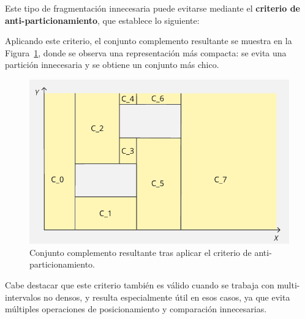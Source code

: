 Este tipo de fragmentación innecesaria puede evitarse mediante el \textbf{criterio de anti-particionamiento}, que establece lo siguiente:

\begin{center}
\end{center}


Aplicando este criterio, el conjunto complemento resultante se muestra en la Figura~\ref{fig:compleNue}, donde se observa una representación más compacta: se evita una partición innecesaria y se obtiene un conjunto más chico.

\begin{figure}[htbp]
    \centering
    \includegraphics[width=0.8\linewidth]{figures/Optimazaciones/Complement/complNue.png}
    \caption{Conjunto complemento resultante tras aplicar el criterio de anti-particionamiento.}
    \label{fig:compleNue}
\end{figure}

Cabe destacar que este criterio también es válido cuando se trabaja con multi-intervalos no densos, y resulta especialmente útil en esos casos, ya que evita múltiples operaciones de posicionamiento y comparación innecesarias.

